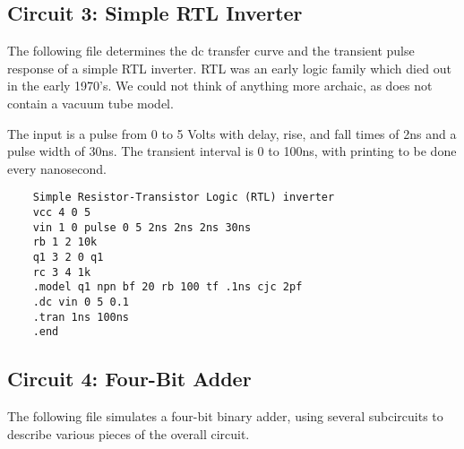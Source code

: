 \subsection{Circuit 3:  Simple RTL Inverter}


The following file determines the dc transfer curve and the transient
pulse response of a simple RTL inverter.  RTL was an early logic
family which died out in the early 1970's.  We could not think of
anything more archaic, as {\WRspice} does not contain a vacuum tube
model.

The input is a pulse from 0 to 5 Volts with delay, rise, and fall
times of 2ns and a pulse width of 30ns.  The transient interval is 0
to 100ns, with printing to be done every nanosecond.

\begin{verbatim}
    Simple Resistor-Transistor Logic (RTL) inverter
    vcc 4 0 5
    vin 1 0 pulse 0 5 2ns 2ns 2ns 30ns
    rb 1 2 10k
    q1 3 2 0 q1
    rc 3 4 1k
    .model q1 npn bf 20 rb 100 tf .1ns cjc 2pf
    .dc vin 0 5 0.1
    .tran 1ns 100ns
    .end
\end{verbatim}

\subsection{Circuit 4:  Four-Bit Adder}


The following file simulates a four-bit binary adder, using several
subcircuits to describe various pieces of the overall circuit.

